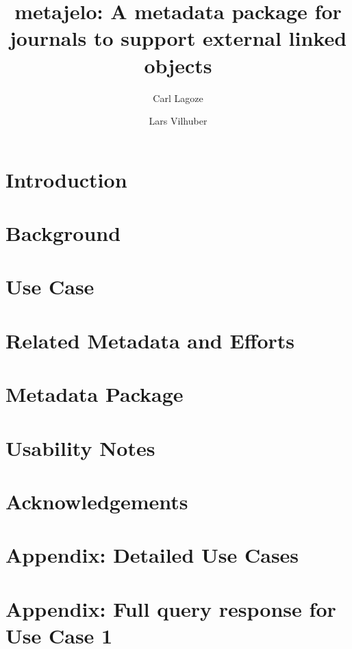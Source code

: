 \documentclass[research,19]{idcc}
\author{Carl Lagoze}
\affil{University of Michigan}
\author{Lars Vilhuber}
\affil{Cornell University}
\title{metajelo: A metadata package for journals to support external linked objects}
\begin{document}
\maketitle

\begin{abstract}
	
\end{abstract}

\section{Introduction}
\label{sec:intro}


\section{Background}
\label{sec:background}


\section{Use Case}
\label{sec:usecase}


\section{Related Metadata and Efforts}
\label{sec:related-metadata}


\section{Metadata Package}
\label{sec:metadata-package}
\label{sec:approach}

\FloatBarrier
\section{Usability Notes}
\label{sec:usability}


\section{Acknowledgements}
\label{sec:ack}



%
%
\printbibliography


\FloatBarrier
\section{Appendix: Detailed Use Cases}
\label{app:cases}

\newcommand{\suppDir}{supplementary_materials}

\FloatBarrier
\section{Appendix: Full query response for Use Case 1}

\end{document}
